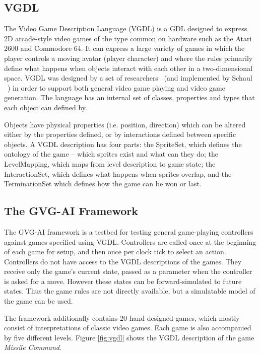 \documentclass{llncs}
\begin{document}
\subsection{VGDL}
The Video Game Description Language (VGDL) is a GDL designed to express 2D arcade-style video games of the type common on hardware such as the Atari 2600 and Commodore 64. It can express a large variety of games in which the player controls a moving avatar (player character) and where the rules primarily define what happens when objects interact with each other in a two-dimensional space. VGDL was designed by a set of researchers~\cite{levine2013general,ebner2013towards} (and implemented by Schaul ~\cite{schaul2013video}) in order to support both general video game playing and video game generation.
The language has an internal set of classes, properties and types that each object can defined by.

Objects have physical properties (i.e. position, direction) which can be altered either by the properties defined, or by interactions defined between specific objects. A VGDL description has four parts: the SpriteSet, which defines the ontology of the game -- which sprites exist and what can they do; the LevelMapping, which maps from level description to game state; the InteractionSet, which defines what happens when sprites overlap, and the TerminationSet which defines how the game can be won or last.


\subsection{The GVG-AI Framework}

The GVG-AI framework is a testbed for testing general game-playing controllers against games specified using VGDL. Controllers are called once at the beginning of each game for setup, and then once per clock tick to select an action. Controllers do not have access to the VGDL descriptions of the games. They receive only the game's current state, passed as a parameter when the controller is asked for a move. However these states can be forward-simulated to future states. Thus the game rules are not directly available, but a simulatable model of the game can be used.

The framework additionally contains 20 hand-designed games, which mostly consist of interpretations of classic video games. Each game is also accompanied by five different levels. Figure \ref{fig:vgdl} shows the VGDL description of the game \emph{Missile Command}.
\end{document}

